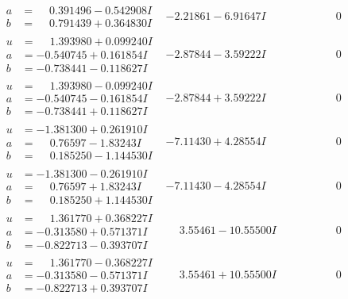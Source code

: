\documentclass[1p]{elsarticle_modified}
\theoremstyle{definition}
\begin{document}
$$\begin{array}{c|c|c}
\begin{aligned}
a &= \phantom{-}0.391496 - 0.542908 I \\
b &= \phantom{-}0.791439 + 0.364830 I\end{aligned}
 & -2.21861 - 6.91647 I & \phantom{-0.000000 } 0 \\ \hline\begin{aligned}
u &= \phantom{-}1.393980 + 0.099240 I \\
a &= -0.540745 + 0.161854 I \\
b &= -0.738441 - 0.118627 I\end{aligned}
 & -2.87844 - 3.59222 I & \phantom{-0.000000 } 0 \\ \hline\begin{aligned}
u &= \phantom{-}1.393980 - 0.099240 I \\
a &= -0.540745 - 0.161854 I \\
b &= -0.738441 + 0.118627 I\end{aligned}
 & -2.87844 + 3.59222 I & \phantom{-0.000000 } 0 \\ \hline\begin{aligned}
u &= -1.381300 + 0.261910 I \\
a &= \phantom{-}0.76597 - 1.83243 I \\
b &= \phantom{-}0.185250 - 1.144530 I\end{aligned}
 & -7.11430 + 4.28554 I & \phantom{-0.000000 } 0 \\ \hline\begin{aligned}
u &= -1.381300 - 0.261910 I \\
a &= \phantom{-}0.76597 + 1.83243 I \\
b &= \phantom{-}0.185250 + 1.144530 I\end{aligned}
 & -7.11430 - 4.28554 I & \phantom{-0.000000 } 0 \\ \hline\begin{aligned}
u &= \phantom{-}1.361770 + 0.368227 I \\
a &= -0.313580 + 0.571371 I \\
b &= -0.822713 - 0.393707 I\end{aligned}
 & \phantom{-}3.55461 - 10.55500 I & \phantom{-0.000000 } 0 \\ \hline\begin{aligned}
u &= \phantom{-}1.361770 - 0.368227 I \\
a &= -0.313580 - 0.571371 I \\
b &= -0.822713 + 0.393707 I\end{aligned}
 & \phantom{-}3.55461 + 10.55500 I & \phantom{-0.000000 } 0 \\ \hline\begin{aligned}

\end{aligned}
\end{array}$$
\end{document}

